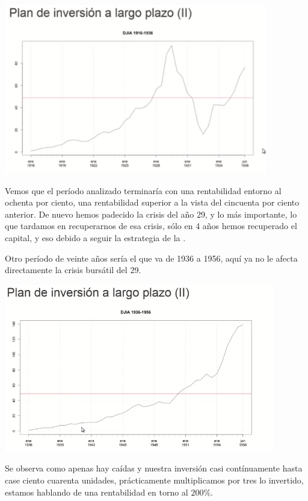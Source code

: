 \begin{center}
    \includegraphics[scale=.65]{images/mod03-05.png}
\end{center}
Vemos que el período analizado terminaría con una rentabilidad entorno al ochenta por ciento, una rentabilidad superior a la vista del cincuenta por ciento anterior. De nuevo hemos padecido la crisis del año 29, y lo más importante, lo que tardamos en recuperarnos de esa crisis, sólo en 4 años hemos recuperado el capital, y eso debido a seguir la estrategia de la .

Otro período de veinte años sería el que va de 1936 a 1956, aquí ya no le afecta directamente la crisis bursátil del 29.

\begin{center}
    \includegraphics[scale=.65]{images/mod03-07.png}
\end{center}
Se observa como apenas hay caídas y nuestra inversión casi contínuamente hasta case ciento cuarenta unidades, prácticamente multiplicamos por tres lo invertido, estamos hablando de una rentabilidad en torno al $200\%$. 

